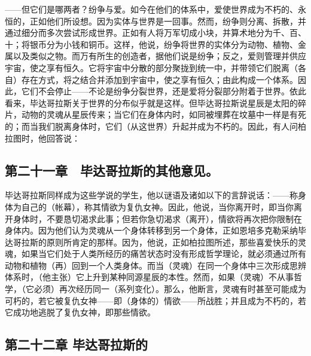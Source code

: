 ——但它们是哪两者？纷争与爱。如今在他们的体系中，爱使世界成为不朽的、永恒的，正如他们所设想。因为实体与世界是一回事。然而，纷争则分离、拆散，并通过细分而多次尝试形成世界。正如有人将万军切成小块，并算术地分为千、百、十；将银币分为小钱和铜币。这样，他说，纷争将世界的实体分为动物、植物、金属以及类似之物。而万有所生的创造者，据他们说是纷争；反之，爱则管理并供应宇宙，使之享有恒久。它将宇宙中分散的部分聚拢到统一中，并带领它们脱离（各自）存在方式，将之结合并添加到宇宙中，使之享有恒久；由此构成一个体系。因此，它们不会停止——不论是纷争分裂世界，还是爱将分裂部分附着于世界。依此看来，毕达哥拉斯关于世界的分布似乎就是这样。但毕达哥拉斯说星辰是太阳的碎片，动物的灵魂从星辰传来；当它们在身体内时，如同被埋葬在坟墓中一样是有死的；而当我们脱离身体时，它们（从这世界）升起并成为不朽的。因此，有人问柏拉图时，他回答说：\par


\subsection{第二十一章　毕达哥拉斯的其他意见。}

毕达哥拉斯同样成为这些学说的学生，他以谜语及诸如以下的言辞说话：——称身体为自己的（帐幕），称其情欲为复仇女神。因此，他说，当你离开时，即当你离开身体时，不要恳切渴求此事；但若你急切渴求（离开），情欲将再次把你限制在身体内。因为他们认为灵魂从一个身体转移到另一个身体，正如恩培多克勒采纳毕达哥拉斯的原则所肯定的那样。因为，他说，正如柏拉图所述，那些喜爱快乐的灵魂，如果当它们处于人类所经历的痛苦状态时没有形成哲学理论，就必须通过所有动物和植物（再）回到一个人类身体。而当（灵魂）在同一个身体中三次形成思辨体系时，（他主张）它上升到某种同源星辰的本性。然而，如果（灵魂）不从事哲学，（它必须）再次经历同一（系列变化）。那么，他断言，灵魂有时甚至可能成为可朽的，若它被复仇女神——即（身体的）情欲——所战胜；并且成为不朽的，若它成功地逃脱了复仇女神，即那些情欲。\par


\subsection{第二十二章 毕达哥拉斯的}

